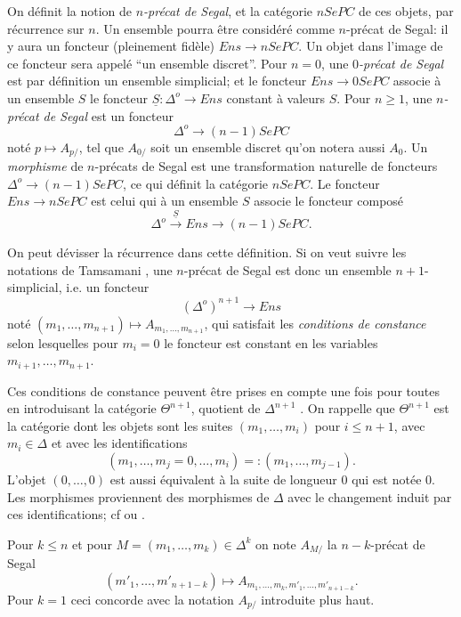 \documentclass[12pt]{article}
\begin{document}
On d\'efinit la notion de {\em $n$-pr\'ecat de
Segal}, et la cat\'egorie $nSePC$ de ces objets, par r\'ecurrence sur $n$. Un
ensemble pourra \^etre consid\'er\'e comme $n$-pr\'ecat de Segal: il y aura un
foncteur (pleinement fid\`ele) $Ens\rightarrow nSePC$.
Un objet dans l'image de ce foncteur sera appel\'e ``un ensemble discret''.
Pour $n=0$, une {\em $0$-pr\'ecat de
Segal} est par d\'efinition un ensemble simplicial; et le foncteur
$Ens\rightarrow 0SePC$ associe \`a un ensemble $S$ le foncteur
$\underline{S}:\Delta ^o\rightarrow Ens$ constant \`a valeurs $S$. Pour
$n\geq 1$, une {\em
$n$-pr\'ecat de Segal} est un foncteur
$$
\Delta ^o\rightarrow (n-1)SePC
$$
not\'e $p\mapsto A_{p/}$, tel que $A_{0/}$ soit un ensemble discret qu'on
notera aussi
$A_0$. Un {\em morphisme} de $n$-pr\'ecats de Segal est une transformation
naturelle de foncteurs $\Delta ^o\rightarrow (n-1)SePC$, ce qui d\'efinit la
cat\'egorie $nSePC$. Le foncteur $Ens\rightarrow nSePC$ est celui qui \`a un
ensemble $S$ associe le foncteur compos\'e
$$
\Delta ^o\stackrel{\underline{S}}{\rightarrow} Ens \rightarrow (n-1)SePC.
$$

On peut d\'evisser la r\'ecurrence dans cette d\'efinition. Si on veut
suivre les
notations de Tamsamani \cite{Tamsamani}, une $n$-pr\'ecat de Segal est donc un
ensemble $n+1$-simplicial, i.e. un foncteur
$$
(\Delta ^o)^{n+1}\rightarrow Ens
$$
not\'e $(m_1,\ldots , m_{n+1})\mapsto A_{m_1,\ldots , m_{n+1}}$,
qui satisfait les {\em  conditions de constance} selon lesquelles
pour $m_i=0$ le
foncteur
est constant en les variables $m_{i+1},\ldots , m_{n+1}$.

Ces conditions de
constance peuvent \^etre prises en compte une fois pour toutes en
introduisant la cat\'egorie $\Theta ^{n+1}$, quotient de $\Delta ^{n+1}$
\cite{nCAT}.
On rappelle  que $\Theta ^{n+1}$ est la cat\'egorie dont les objets sont les
suites $(m_1,\ldots , m_i)$ pour $i\leq n+1$, avec $m_i\in \Delta$ et avec
les identifications
$$
(m_1,\ldots , m_j=0, \ldots , m_i) =: (m_1,\ldots , m_{j-1}).
$$
L'objet $(0,\ldots , 0)$ est aussi \'equivalent \`a la suite de longueur
$0$ qui est not\'ee $0$. Les morphismes proviennent des morphismes de
$\Delta$ avec le changement induit par ces identifications; cf \cite{nCAT}
ou \cite{limits}.

Pour $k\leq n$ et pour $M=(m_1,\ldots , m_k)\in \Delta ^k$ on note $A_{M/}$
la $n-k$-pr\'ecat de Segal
$$
(m'_1,\ldots , m'_{n+1-k})\mapsto A_{m_1,\ldots , m_k, m'_1,\ldots ,
m'_{n+1-k}}.
$$
Pour $k=1$ ceci concorde avec la notation $A_{p/}$ introduite plus haut.
\end{document}
